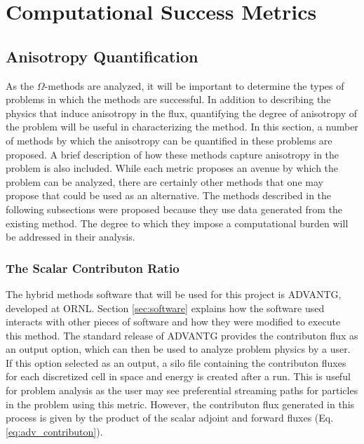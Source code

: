 \newcommand{\anglevars}{x,y,z,E_g,\theta,\varphi}
\newcommand{\scalarvars}{x,y,z,E_g}


\section{Computational Success Metrics}
\label{sec:successmetrics}
\subsection{Anisotropy Quantification}
\label{sec:anisotropy_quant}

As the $\Omega$-methods are analyzed, it will be important to determine the
types of problems in which the methods are successful. In addition to describing
the physics that induce anisotropy in the flux, quantifying the degree of
anisotropy of the problem will be useful in characterizing the method. In this
section, a number
of methods by which the anisotropy can be quantified in these problems are
proposed. A brief description of how these methods capture anisotropy in the
problem is also included. While each metric proposes an avenue by which the
problem can be analyzed, there are certainly other methods that one may propose
that could be used as an alternative. The methods described in the following
subsections were proposed because they use data generated from the existing
method. The degree to which they impose a computational burden will be addressed
in their analysis.

\subsubsection{The Scalar Contributon Ratio}

The hybrid methods software that will be used for this project is ADVANTG,
developed at ORNL. Section \ref{sec:software} explains how the software used
interacts with other pieces of software
and how they were modified to execute this method.
The standard release of ADVANTG provides the contributon flux as an output
option, which can then be used to analyze problem physics by a user.
If this option selected as an output, a silo file containing
the contributon fluxes for each discretized cell in space and energy  is
created after
a run. This is useful for problem analysis as the user may see
preferential streaming paths for particles in the problem using this metric.
However, the contributon flux generated in this process is given by the product
of the scalar adjoint and forward fluxes (Eq. \ref{eq:adv_contributon}).

